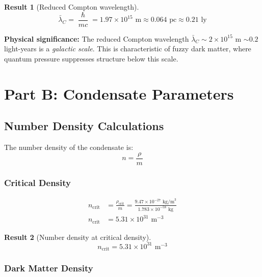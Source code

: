 \documentclass[11pt,a4paper]{article}
\newcommand{\ee}[1]{\times 10^{#1}}
\newcommand{\hbar}{\ensuremath{\hslash}}
\newcommand{\rhocrit}{\ensuremath{\rho_{\mathrm{crit}}}}
\newtheorem{result}{Result}
\begin{document}
\begin{result}[Reduced Compton wavelength]
\begin{equation}
\boxed{\bar{\lambda}_C = \frac{\hbar}{mc} = 1.97 \times 10^{15} \text{ m} \approx 0.064 \text{ pc} \approx 0.21 \text{ ly}}
\end{equation}
\end{result}

\textbf{Physical significance:} The reduced Compton wavelength $\bar{\lambda}_C \sim 2 \ee{15}$ m $\sim 0.2$ light-years is a \emph{galactic scale}. This is characteristic of fuzzy dark matter, where quantum pressure suppresses structure below this scale.

\section{Part B: Condensate Parameters}
\label{sec:partB}

\subsection{Number Density Calculations}

The number density of the condensate is:
\begin{equation}
n = \frac{\rho}{m}
\end{equation}

\subsubsection{Critical Density}

\begin{align}
n_{\mathrm{crit}} &= \frac{\rhocrit}{m} = \frac{9.47 \ee{-27} \text{ kg/m}^3}{1.783 \ee{-58} \text{ kg}} \nonumber \\
n_{\mathrm{crit}} &= 5.31 \ee{31} \text{ m}^{-3}
\end{align}

\begin{result}[Number density at critical density]
\begin{equation}
\boxed{n_{\mathrm{crit}} = 5.31 \times 10^{31} \text{ m}^{-3}}
\end{equation}
\end{result}

\subsubsection{Dark Matter Density}
\end{document}
